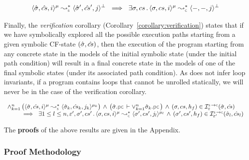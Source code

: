 \begin{corollary}\label{bug:finding}
$$
\transabssemrule{\sstate, \scs, i}{\sstate', \scs', j}{\mode}{\bot}{\symbolic}  
      \ \implies \  \exists \jstate, \cs \, . \, \transabssemrule{\jstate, \cs, i}{-, -, j}{\mode}{\bot}{\concrete} 
$$
\end{corollary}

Finally, the \emph{verification} corollary (Corollary~\ref{corollary:verification})
states that if we have symbolically explored all the possible execution paths
starting from a given symbolic CF-state $(\hat{\sigma}, \hat{cs})$,  
then the execution of the program starting from  any concrete state in the models 
of the initial symbolic state (under the initial path condition) will result in a final concrete state
in the models of one of the final symbolic states (under its associated path condition).  
As \cosette does not infer loop invariants, if a \jsil program contains loops that cannot be 
unrolled statically, we will never be in the case of the verification corollary. 

\begin{corollary}[Verification]\label{corollary:verification}
$$
\begin{array}{l}
\wedge_{k=1}^n \, \big( \transabssemrule{\sstate, \scs, i}{\sstate_k, \scs_k, j_k}{\mode}{\mode_k}{\symbolic}  \big)
    \, \wedge \, \big( \sstate.\pcsel \vdash \vee_{k=1}^n \sstate_k.\pcsel \big) 
    \, \wedge \, (\jstate, \cs, \heap_f) \in \interpret{\symbconc}{\senv}(\sstate, \scs)
    \\ \quad \quad
%
      \ \implies \ \exists 1 \leq l \leq n, \senv', \jstate', \cs' \, . \, 
           \transabssemrule{\jstate, \cs, i}{\jstate', \cs', j_l}{\mode}{\mode_l}{\concrete}
           \, \wedge \, 
           (\jstate', \cs', \heap_f) \in \interpret{\symbconc}{\senv'}(\sstate_l, \scs_l)
\end{array}
$$
\end{corollary}

%
The {\bf proofs} of the above results are given in the Appendix.  

\subsubsection{Proof Methodology}










